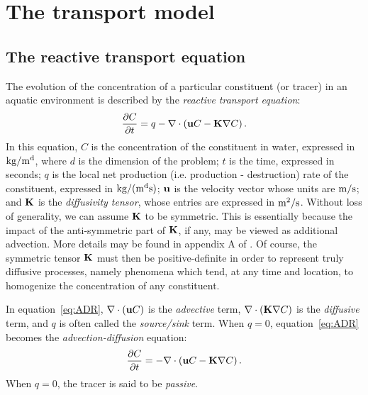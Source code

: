 \chapter{The transport model} \label{chap:transportmodel}
\section{The reactive transport equation}
The evolution of the concentration of a particular constituent (or tracer) in an aquatic environment is described by the \textit{reactive transport equation}:
\begin{equation}\label{eq:ADR}
	\frac{\partial C}{\partial t} = q-\nabla \cdot \left(\b uC - \b K \nabla C\right).
\end{equation}
In this equation, $C$ is the concentration of the constituent in water, expressed in $\rm{kg/m^d}$, where $d$ is the dimension of the problem; $t$ is the time, expressed in seconds; $q$ is the local net production (i.e. production - destruction) rate of the constituent, expressed in $\rm{kg/(m^ds)}$; $\b u$ is the velocity vector whose units are $\rm{m/s}$; and $\b K$ is the \textit{diffusivity tensor}, whose entries are expressed in $\rm{m^2/s}$. Without loss of generality, we can assume $\b K$ to be symmetric. This is essentially because the impact of the anti-symmetric part of $\b K$, if any, may be viewed as additional advection. More details may be found in appendix A of \cite{deleersnijder2001concept}. Of course, the symmetric tensor $\b K$ must then be positive-definite in order to represent truly diffusive processes, namely phenomena which tend, at any time and location, to homogenize the concentration of any constituent.

In equation~\eqref{eq:ADR}, $\nabla \cdot (\b u C)$ is the \textit{advective} term, $\nabla \cdot (\b K \nabla C)$ is the \textit{diffusive} term, and $q$ is often called the \textit{source/sink} term. When $q=0$, equation~\eqref{eq:ADR} becomes the \textit{advection-diffusion} equation:
\begin{equation}\label{eq:C_PDE_vec}
 	\frac{\partial C}{\partial t} = -\nabla \cdot \left(\b uC - \b K \nabla C\right).
 \end{equation}
 When $q=0$, the tracer is said to be \textit{passive}.

